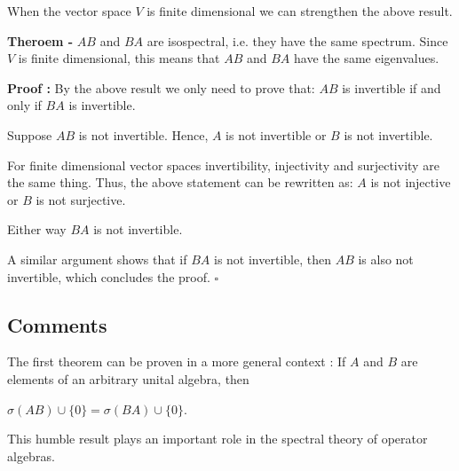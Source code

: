 \documentclass[12pt]{article}
\begin{document}
When the vector space $V$ is finite dimensional we can strengthen the above result.

{\bf Theroem -} $AB$ and $BA$ are isospectral, i.e. they have the same spectrum. Since $V$ is finite dimensional, this means that $AB$ and $BA$ have the same eigenvalues.

{\bf Proof :} By the above result we only need to prove that: $AB$ is invertible if and only if $BA$ is invertible.

Suppose $AB$ is not invertible. Hence, $A$ is not invertible or $B$ is not invertible.

For finite dimensional vector spaces invertibility, injectivity and surjectivity are the same thing. Thus, the above statement can be rewritten as: $A$ is not injective or $B$ is not surjective.

Either way $BA$ is not invertible.

A similar argument shows that if $BA$ is not invertible, then $AB$ is also not invertible, which concludes the proof. $\square$

\subsection{Comments}

The first theorem can be proven in a more general context : If $A$ and $B$ are elements of an arbitrary unital algebra, then \begin{center}
$\sigma(AB) \cup \{0\} = \sigma(BA) \cup \{0\}$.
\end{center}

This humble result plays an important role in the spectral theory of operator algebras.
\end{document}
